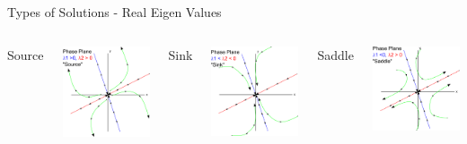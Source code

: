 \begin{frame}{Types of Solutions - Real Eigen Values}

  \begin{columns}

    Source

    \includegraphics[width=4.5cm]{img/phasePlaneSource}

    Sink

    \includegraphics[width=4.5cm]{img/phasePlaneSink}

    Saddle

    \includegraphics[width=4.5cm]{img/phasePlaneSaddle}

  \end{columns}
  
\end{frame}

